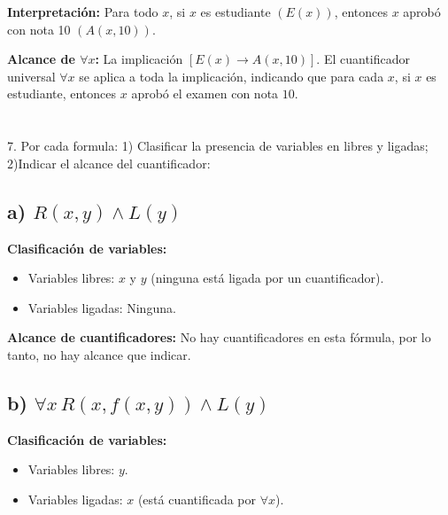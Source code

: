 \documentclass[11pt,letterpaper]{article}
\begin{document}
\textbf{Interpretación:} Para todo \( x \), si \( x \) es estudiante \( (E(x)) \), entonces \( x \) aprobó con nota 10 \( (A(x, 10)) \).

\textbf{Alcance de \( \forall x \):}
La implicación \( [E(x) \to A(x, 10)] \). El cuantificador universal \( \forall x \) se aplica a toda la implicación, indicando que para cada \( x \), si \( x \) es estudiante, entonces \( x \) aprobó el examen con nota \( 10 \).













\section{}7. Por cada formula: 1) Clasificar la presencia de variables en libres y ligadas; 2)Indicar el alcance del cuantificador:

\subsection*{a) \( R(x, y) \land L(y) \)}

\textbf{Clasificación de variables:}
\begin{itemize}
    \item Variables libres: \( x \) y \( y \) (ninguna está ligada por un cuantificador).
    \item Variables ligadas: Ninguna.
\end{itemize}

\textbf{Alcance de cuantificadores:} No hay cuantificadores en esta fórmula, por lo tanto, no hay alcance que indicar.

\subsection*{b) \( \forall x \, R(x, f(x, y)) \land L(y) \)}

\textbf{Clasificación de variables:}
\begin{itemize}
    \item Variables libres: \( y \).
    \item Variables ligadas: \( x \) (está cuantificada por \( \forall x \)).
\end{itemize}
\end{document}
